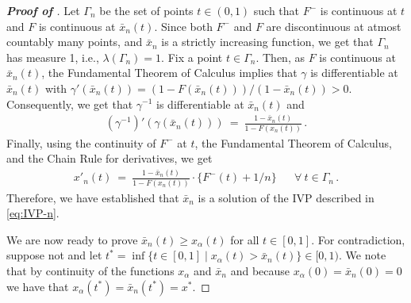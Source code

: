 \begin{proof}[\textbf{Proof of }]
	Let $\Gamma_n$ be the set of points $t \in (0,1)$ such that $F^-$ is continuous at $t$ and $F$ is continuous at $\bar x_n(t)$. Since both $F^-$ and $F$ are discontinuous at atmost countably many points, and $\bar x_n$ is a strictly increasing function, we get that $\Gamma_n$ has measure 1, i.e., $\lambda(\Gamma_n) = 1$. Fix a point $t \in \Gamma_n$. Then, as $F$ is continuous at $\bar x_n(t)$, the Fundamental Theorem of Calculus implies that $\gamma$ is differentiable at $\bar x_n(t)$ with $\gamma'(\bar x_n(t)) = (1- F(\bar x_n(t)))/(1 - \bar x_n(t)) > 0$. Consequently, we get that $\gamma^{-1}$ is differentiable at $\bar x_n(t)$ and
	\begin{align*}
		(\gamma^{-1})'(\gamma(\bar x_n(t)))\ =\ \frac{1 - \bar x_n(t)}{1 - F(x_n(t))}\,.
	\end{align*}
	Finally, using the continuity of $F^-$ at $t$, the Fundamental Theorem of Calculus, and the Chain Rule for derivatives, we get
	\begin{align*}
		x'_n(t)\ =\ \frac{1 - \bar x_n(t)}{1 - F(x_n(t))} \cdot \{F^-(t) + 1/n\} &&\forall\ t\in \Gamma_n\,.
	\end{align*}
	Therefore, we have established that $\bar x_n$ is a solution of the IVP described in \eqref{eq:IVP-n}. 
	
	We are now ready to prove $\bar x_n(t) \geq x_\alpha(t)$ for all $t \in [0,1]$. For contradiction, suppose not and let $t^* = \inf\{t \in [0,1] \mid x_\alpha(t) > \bar x_n(t)\} \in [0,1)$. We note that by continuity of the functions $x_\alpha$ and $\bar x_n$ and because $x_\alpha(0) = \bar x_n(0) =0$ we have that $x_\alpha(t^*) = \bar x_n(t^*) = x^*$. 
    

\end{proof}
